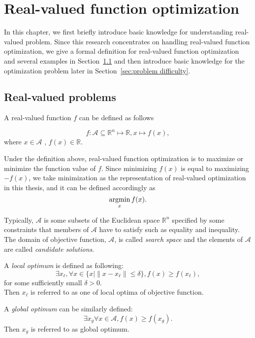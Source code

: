 \chapter{Real-valued function optimization}
\label{ch:real-valued function optimization}

In this chapter, we first briefly introduce basic knowledge for
understanding real-valued problem.
Since this research concentrates on handling real-valued function
optimization, we give a formal definition for real-valued function
optimization and several examples in Section~\ref{sec:problem define}
and then introduce basic knowledge for the optimization problem later in
Section~\ref{sec:problem difficulty}. 


\section{Real-valued problems}
\label{sec:problem define}
A real-valued function $f$ can be defined as follows

\newcommand{\argmin}{\operatornamewithlimits{argmin}}
\[f \colon \mathcal{A} \subseteq \mathbb{R}^n \mapsto \mathbb{R} , x \mapsto f(x),\] where $x \in \mathcal{A}$ , $f(x) \in \mathbb{R}$.

Under the definition above, real-valued function optimization is to
maximize or minimize the function value of $f$.
Since minimizing $f(x)$ is equal to maximizing $-f(x)$, we take
minimization as the representation of real-valued optimization in this
thesis, and it can be defined accordingly as \[
\operatornamewithlimits{argmin}\limits_{x} f(x).\]

Typically, $\mathcal{A}$ is some subsets of the Euclidean space
$\mathbb{R}^n$ specified by some constraints that members of
$\mathcal{A}$ have to satisfy such as equality and inequality.
The domain of objective function, $\mathcal{A}$, is called \emph{search
space} and the elements of $\mathcal{A}$ are called \emph{candidate
solutions}.

A \emph{local optimum} is defined as following: \[\exists x_\ell,
\forall x \in \{x\mid \|x-x_\ell\| \leq \delta \},  f(x) \geq
f(x_\ell),\] for some sufficiently small $\delta > 0$. \\
Then $x_\ell$ is referred to as one of local optima of objective function.

A \emph{global optimum} can be similarly defined:
\[\exists x_g \forall x \in \mathcal{A}, f(x) \geq f(x_g).\]
Then $x_g$ is referred to as global optimum.

